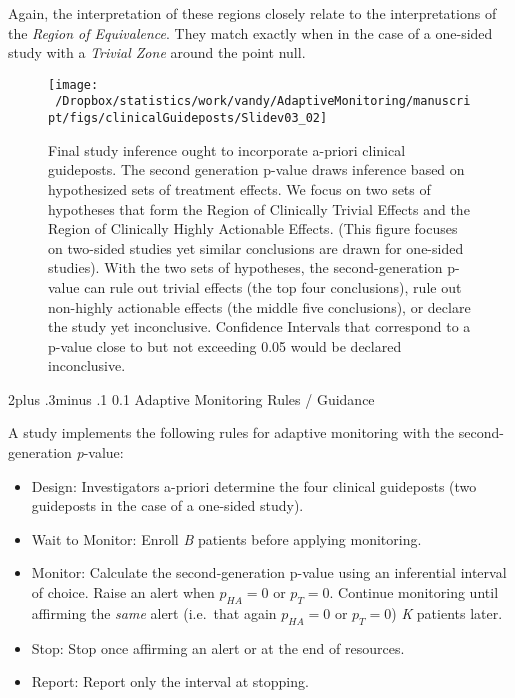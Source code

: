 \documentclass[12pt,oneside]{book}
\makeatletter
\newlength{\li}\setlength{\li}{14.48pt}
\newlength{\di}\setlength{\di}{-3.5mm}
\renewcommand\section{ \@startsection {section}{1}{\z@}%
    {2\@bls  plus .3\@bls minus .1\@bls}%
    {0.1\@bls}%
    {\centering\normalfont}}
\theoremstyle{definition}
\theoremstyle{definition}
\theoremstyle{definition}
\theoremstyle{remark}
\makeatother
\begin{document}
Again, the interpretation of these regions closely relate to the
interpretations of the \emph{Region of Equivalence}. They match exactly
when in the case of a one-sided study with a \emph{Trivial Zone} around
the point null.

\begin{figure}[H]

{\centering \texttt{[image: ~/Dropbox/statistics/work/vandy/AdaptiveMonitoring/manuscript/figs/clinicalGuideposts/Slidev03\_02]} 

}

\caption{Final study inference ought to incorporate a-priori clinical guideposts.  The second generation p-value draws inference based on hypothesized sets of treatment effects.  We focus on two sets of hypotheses that form the Region of Clinically Trivial Effects and the Region of Clinically Highly Actionable Effects. (This figure focuses on two-sided studies yet similar conclusions are drawn for one-sided studies). With the two sets of hypotheses, the second-generation p-value can rule out trivial effects (the top four conclusions), rule out non-highly actionable effects (the middle five conclusions), or declare the study yet inconclusive.  Confidence Intervals that correspond to a p-value close to but not exceeding 0.05 would be declared inconclusive.}\label{fig:figs}
\end{figure}

\hypertarget{adaptive-monitoring-rules-guidance}{%
\section{Adaptive Monitoring Rules /
Guidance}\label{adaptive-monitoring-rules-guidance}}

A study implements the following rules for adaptive monitoring with the
second-generation \emph{p}-value:

\begin{itemize}
\item
  Design: Investigators a-priori determine the four clinical guideposts
  (two guideposts in the case of a one-sided study).
\item
  Wait to Monitor: Enroll \emph{B} patients before applying monitoring.
\item
  Monitor: Calculate the second-generation p-value using an inferential
  interval of choice. Raise an alert when \(p_{HA} = 0\) or \(p_T = 0\).
  Continue monitoring until affirming the \emph{same} alert (i.e.~that
  again \(p_{HA} = 0\) or \(p_T = 0\)) \emph{K} patients later.
\item
  Stop: Stop once affirming an alert or at the end of resources.
\item
  Report: Report only the interval at stopping.
\end{itemize}
\end{document}
